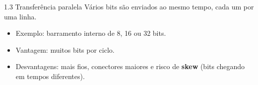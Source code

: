 \begin{frame}{1.3 Transferência paralela}
  Vários bits são enviados ao mesmo tempo, cada um por uma linha.
  \begin{center}
  \end{center}
  \begin{itemize}
    \item Exemplo: barramento interno de 8, 16 ou 32 bits.
    \item Vantagem: muitos bits por ciclo.
    \item Desvantagens: mais fios, conectores maiores e risco de \textbf{skew} (bits chegando em tempos diferentes).
  \end{itemize}
\end{frame}
